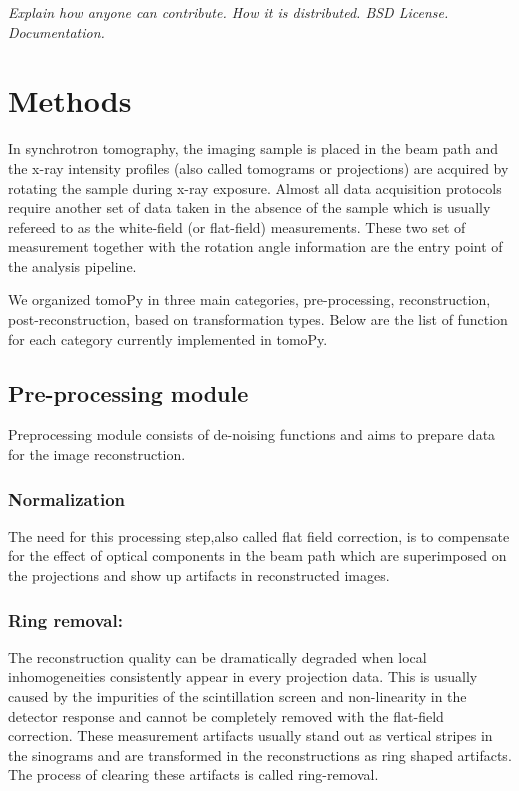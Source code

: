 \documentclass[pdf]{iucr}              %
\begin{document}
{\it Explain how anyone can contribute. How it is distributed. BSD License. Documentation.}

\section{Methods} 

In synchrotron tomography, the imaging sample is placed in the beam path and the x-ray intensity profiles (also called tomograms or projections) are acquired by rotating the sample during x-ray exposure. Almost all data acquisition protocols require another set of data taken in the absence of the sample which is usually refereed to as the white-field (or flat-field) measurements. These two set of measurement together with the rotation angle information are the entry point of the analysis pipeline.

We organized tomoPy in three main categories, pre-processing, reconstruction, post-reconstruction, based on transformation types. Below are the list of function for each category currently implemented in tomoPy.

\subsection{Pre-processing module}

Preprocessing module consists of de-noising functions and aims to prepare data for the image reconstruction.

\subsubsection{Normalization}

The need for this processing step,also called flat field correction, is to compensate for the effect of optical components in the beam path which are superimposed on the projections and show up artifacts in reconstructed images. 

\subsubsection{Ring removal:}

The reconstruction quality can be dramatically degraded when local inhomogeneities consistently appear in every projection data.  This is usually caused by the impurities of the scintillation screen and non-linearity in the detector response and cannot be completely removed with the flat-field correction. These measurement artifacts usually stand out as vertical stripes in the sinograms and are transformed in the reconstructions as ring shaped artifacts. The process of clearing these artifacts is called ring-removal. 
\end{document}
